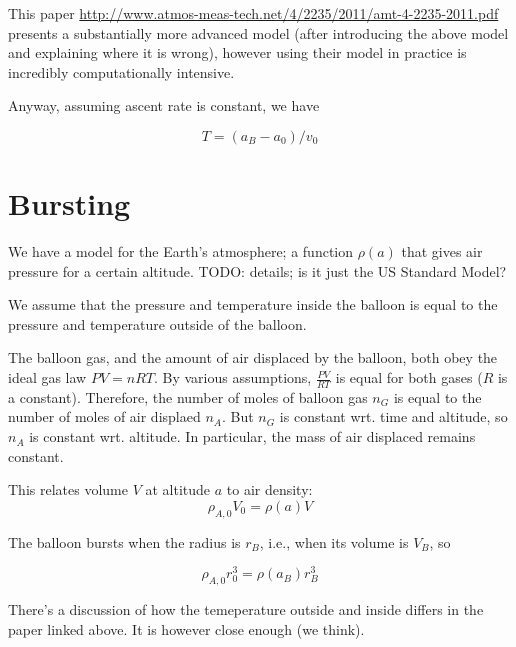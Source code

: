 \documentclass{article}
\begin{document}
This paper \url{http://www.atmos-meas-tech.net/4/2235/2011/amt-4-2235-2011.pdf} presents
a substantially more advanced model (after introducing the above model and explaining
where it is wrong), however using their model in practice is incredibly computationally
intensive.

Anyway, assuming ascent rate is constant, we have

\[  T = (a_B - a_0) / v_0 \]

\section{Bursting}

We have a model for the Earth's atmosphere; a function $\rho(a)$ that gives
air pressure for a certain altitude.
TODO: details; is it just the US Standard Model?

We assume that the pressure and temperature inside the balloon is equal
to the pressure and temperature outside of the balloon.

The balloon gas, and the amount of air displaced by the balloon, both
obey the ideal gas law $PV=nRT$. By various assumptions, $\frac{PV}{RT}$ is
equal for both gases ($R$ is a constant).
Therefore, the number of moles of balloon gas $n_G$ is equal to the number
of moles of air displaed $n_A$. But $n_G$ is constant wrt. time and altitude,
so $n_A$ is constant wrt. altitude. In particular, the mass of air displaced
remains constant.

This relates volume $V$ at altitude $a$ to air density: 
\[
    \rho_{A,0} V_0 = \rho(a) V
\]

The balloon bursts when the radius is $r_B$, i.e., when its volume is $V_B$, so

\[
    \rho_{A,0} r_0^3 = \rho(a_B) r_B^3
\]

There's a discussion of how the temeperature outside and inside differs in
the paper linked above. It is however close enough (we think).
\end{document}
